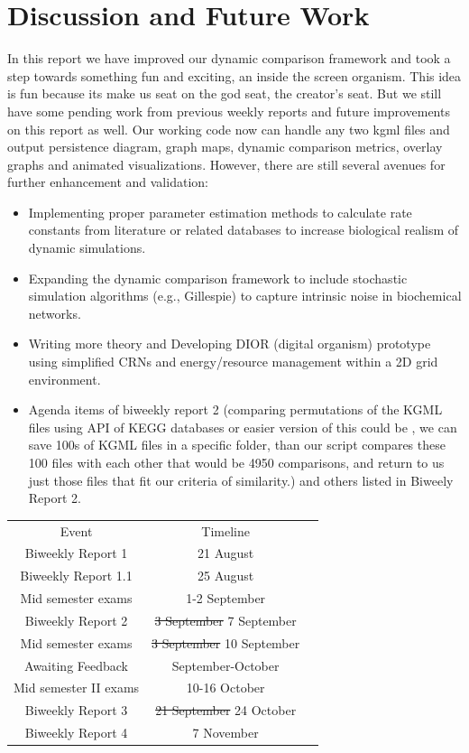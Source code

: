\documentclass[12pt,a4paper]{article}
\begin{document}
\section*{Discussion and Future Work}
In this report we have improved our dynamic comparison framework and took a step towards something fun and exciting, an inside the screen organism. This idea is fun because its make us seat on the god seat, the creator's seat. But we still have some pending work from previous weekly reports and future improvements on this report as well.
Our working code now can handle any two kgml files and output persistence diagram, graph maps, dynamic comparison metrics, overlay graphs and animated visualizations. However, there are still several avenues for further enhancement and validation:
\begin{itemize}
    \item Implementing proper parameter estimation methods to calculate rate constants from literature or related databases to increase biological realism of dynamic simulations.
    \item Expanding the dynamic comparison framework to include stochastic simulation algorithms (e.g., Gillespie) to capture intrinsic noise in biochemical networks.
    \item Writing more theory and Developing  DIOR (digital organism) prototype using simplified CRNs and energy/resource management within a 2D grid environment.
    \item Agenda items of biweekly report 2 (comparing permutations
    of the KGML files using API of KEGG databases or easier version of this
    could be , we can save 100s of KGML files in a specific folder, than our script compares
    these 100 files with each other that would be 4950 comparisons, and return to us just those
    files that fit our criteria of similarity.) and others listed in Biweely Report 2.
\end{itemize}
\begin{table}[H]
    \centering
    \begin{tabular}{ccc}
        Event & Timeline \\
        Biweekly Report 1 & 21 August  \\
        Biweekly Report 1.1 &  25 August \\
        Mid semester exams &  1-2 September \\
        Biweekly Report 2 & \sout{3 September} 7 September  \\
        Mid semester exams &  \sout{3 September}  10 September  \\
        Awaiting Feedback &   September-October \\
        Mid semester II exams &    10-16 October \\
        Biweekly Report 3 &  \sout{21 September} 24 October  \\
        Biweekly Report 4 & 7 November \\

    \end{tabular}
    \label{tab:placeholder}
\end{table}
\vfill
{}
\end{document}
